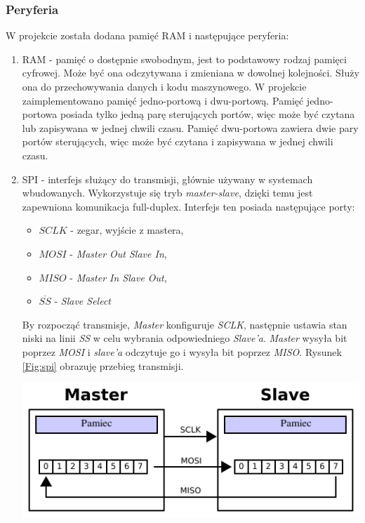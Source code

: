 \documentclass[11pt,a4paper]{article}
\begin{document}
		\subsubsection{Peryferia}
		\hspace{5mm}
			W projekcie została dodana pamięć RAM i następujące peryferia:
			\begin{enumerate}
			\item RAM - pamięć o dostępnie swobodnym, jest to podstawowy rodzaj pamięci cyfrowej. Może być ona odczytywana i zmieniana w dowolnej kolejności. Służy ona do przechowywania danych i kodu maszynowego. W projekcie zaimplementowano pamięć jedno-portową i dwu-portową. Pamięć jedno-portowa posiada tylko jedną parę sterujących portów, więc może być czytana lub zapisywana w jednej chwili czasu. Pamięć dwu-portowa zawiera dwie pary portów sterujących, więc może być czytana i zapisywana w jednej chwili czasu.\cite{ram_book}
			\item SPI - interfejs służący do transmisji, głównie używany w systemach wbudowanych. Wykorzystuje się tryb \textit{master-slave}, dzięki temu jest zapewniona komunikacja full-duplex. Interfejs ten posiada następujące porty:
			\begin{itemize}
			\item $SCLK$ - zegar, wyjście z mastera,
			\item $MOSI$ - \textit{Master Out Slave In},
			\item $MISO$ - \textit{Master In Slave Out},
			\item $\overline{SS}$ - \textit{Slave Select}
			\end{itemize}
			 By rozpocząć transmisje, \textit{Master} konfiguruje \textit{SCLK}, następnie ustawia stan niski na linii \textit{SS} w celu wybrania odpowiedniego \textit{Slave'a}. \textit{Master} wysyła bit poprzez \textit{MOSI} i \textit{slave'a} odczytuje go i wysyła bit poprzez \textit{MISO}. Rysunek \ref{Fig:spi} obrazuję przebieg transmisji\cite{spi_book}.\\
			\begin{minipage}{\textwidth}

				\begin{center}
					\includegraphics[width=13cm]{./rysunki/spi.png}
				\end{center}
			\end{minipage}
			

\end{enumerate}
\end{document}
